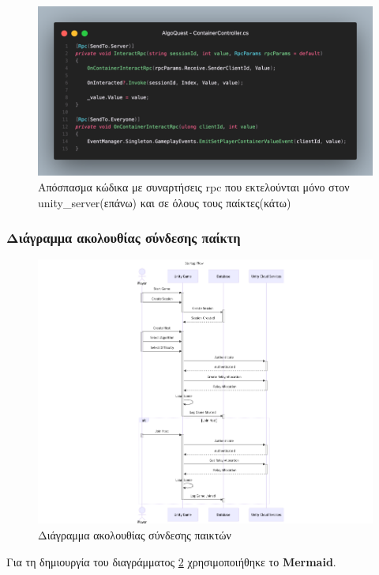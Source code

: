\begin{figure}[H]
    \centering
    \includegraphics[width=0.8\linewidth]{sections/4/4/images/unity_code_rpcs}
    \caption{Απόσπασμα κώδικα με συναρτήσεις \acrshort{rpc} που εκτελούνται μόνο στον \Gls{unity_server}(επάνω) και σε όλους τους παίκτες(κάτω)}
    \label{fig:unity_code_rpcs}
\end{figure}


\subsubsection{Διάγραμμα ακολουθίας σύνδεσης παίκτη}

\begin{figure}[H]
    \centering
    \includegraphics[width=1\linewidth]{sections/4/4/images/startup_flow_sequence_diagram}
    \caption{Διάγραμμα ακολουθίας σύνδεσης παικτών}
    \label{fig:startup_flow_sequence_diagram}
\end{figure}

Για τη δημιουργία του διαγράμματος \ref{fig:startup_flow_sequence_diagram} χρησιμοποιήθηκε το \textbf{Mermaid}\cite{noauthor_mermaid_nodate}.
